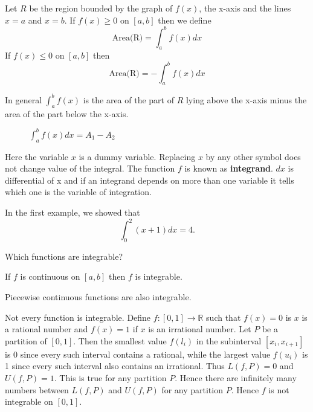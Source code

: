 \documentclass[calc1-main.tex]{subfiles}
\begin{document}
\begin{definition}
  Let $R$ be the region bounded by the graph of $f(x)$, the x-axis and the lines $x=a$ and $x=b$. If $f(x) \ge 0$ on $[a, b]$ then we define
  \[
    \text{Area(R)} = \int_a^b f(x) dx
  \]
  If $f(x) \le 0$ on $[a, b]$ then
  \[
    \text{Area(R)} = -\int_a^b f(x) dx
  \]
\end{definition}

In general $\int_a^b f(x)$ is the area of the part of $R$ lying above the x-axis minus the area of the part below the x-axis.

\begin{figure}[H]
  \centering
  
  \caption{ $\int_a^b f(x) dx = A_1 - A_2$}
\end{figure}

Here the variable $x$ is a dummy variable. Replacing $x$ by any other symbol does not change value of the integral. The function $f$ is known as \textbf{integrand}. $dx$ is differential of x and  if an integrand depends on more than one variable it tells which one is the variable of integration.

In the first example, we showed that
\[
  \int_0^2 (x+1) dx = 4.
\]

Which functions are integrable?
\begin{theorem}
  If $f$ is continuous on $[a, b]$ then $f$ is integrable.
\end{theorem}
Piecewise continuous functions are also integrable.

\begin{example}
  Not every function is integrable. Define $f: [0, 1] \to \mathbb{R}$ such that $f(x) = 0$ is $x$ is a rational number and $f(x)= 1$ if $x$ is an irrational number. Let $P$ be a partition of $[0,1]$. Then the smallest value $f(l_i)$ in the subinterval $[x_i, x_{i+1}]$ is 0 since every such interval contains a rational, while the largest value $f(u_i)$ is 1 since every such interval also contains an irrational. Thus $L(f, P) = 0$ and $U(f, P) = 1$. This is true for any partition $P$. Hence there are infinitely many numbers between $L(f,P)$ and $U(f,P)$ for any partition $P$. Hence $f$ is not integrable on $[0,1]$.
\end{example}
\end{document}
